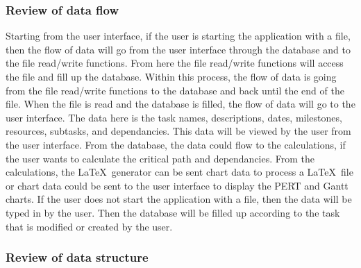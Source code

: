                 \subsubsection{Review of data flow}
                Starting from the user interface, if the user is starting
the application with a file, then the flow of data will go from the user
interface through the database and to the file read/write functions. From
here the file read/write functions will access the file and fill up the
database. Within this process, the flow of data is going from the file
read/write functions to the database and back until the end of the file.
When the file is read and the database is filled, the flow of data will go
to the user interface. The data here is the task names, descriptions,
dates, milestones, resources, subtasks, and dependancies. This data will be
viewed by the user from the user interface. From the database, the data
could flow to the calculations, if the user wants to calculate the critical
path and dependancies. From the calculations, the \LaTeX\ generator can be
sent chart data to process a \LaTeX\ file or chart data could be sent to the
user interface to display the PERT and Gantt charts. If the user does not
start the application with a file, then the data will be typed in by the
user. Then the database will be filled up according to the task that is
modified or created by the user.

          \subsubsection{Review of data structure}

